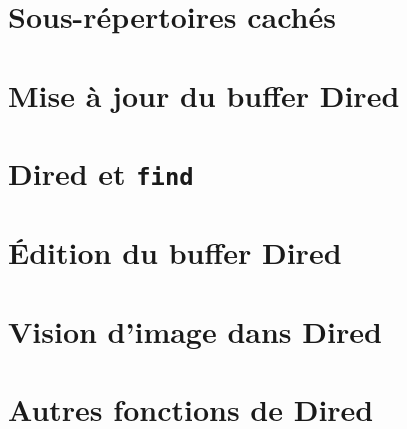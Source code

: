 \section{Sous-répertoires cachés}\label{chap27sec12}
\section{Mise à jour du buffer Dired}\label{chap27sec13}
\section{Dired et \texttt{find}}\label{chap27sec14}
\section{\'Edition du buffer Dired}\label{chap27sec15}
\section{Vision d'image dans Dired}\label{chap27sec16}
\section{Autres fonctions de Dired}\label{chap27sec17}
